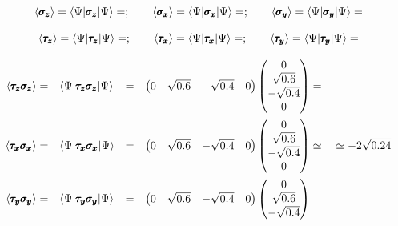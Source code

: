 \documentclass[solutions.tex]{subfiles}
\begin{document}
\[
	\avg{\bm{\sigma_z}} = \bra{\Psi}\bm{\sigma_z}\ket{\Psi} =
		;\qquad
	\avg{\bm{\sigma_x}} = \bra{\Psi}\bm{\sigma_x}\ket{\Psi} =
		;\qquad
	\avg{\bm{\sigma_y}} = \bra{\Psi}\bm{\sigma_y}\ket{\Psi} =
		
\]

\[
	\avg{\bm{\tau_z}} = \bra{\Psi}\bm{\tau_z}\ket{\Psi} =
		;\qquad
	\avg{\bm{\tau_x}} = \bra{\Psi}\bm{\tau_x}\ket{\Psi} =
		;\qquad
	\avg{\bm{\tau_y}} = \bra{\Psi}\bm{\tau_y}\ket{\Psi} =
		
\]

\begin{equation*}\begin{aligned}
	\left\langle \pmb{\tau_z\sigma_z} \right\rangle &=&& \langle \Psi|\pmb{\tau_z\sigma_z}|\Psi\rangle
		&=&& \begin{pmatrix} 0 & \sqrt{0.6} & -\sqrt{0.4} & 0\end{pmatrix}
		\begin{pmatrix}
			0 \\
			\sqrt{0.6} \\
			-\sqrt{0.4} \\
			0 \\
		\end{pmatrix} &=&&  \\
	\left\langle \pmb{\tau_x\sigma_x} \right\rangle &=&& \langle \Psi|\pmb{\tau_x\sigma_x}|\Psi\rangle
		&=&& \begin{pmatrix} 0 & \sqrt{0.6} & -\sqrt{0.4} & 0\end{pmatrix}
		\begin{pmatrix}
			0 \\
			\sqrt{0.6} \\
			-\sqrt{0.4} \\
			0 \\
		\end{pmatrix} &\simeq&& 
		\simeq -2\sqrt{0.24} \\
	\left\langle \pmb{\tau_y\sigma_y} \right\rangle &=&& \langle \Psi|\pmb{\tau_y\sigma_y}|\Psi\rangle
		&=&& \begin{pmatrix} 0 & \sqrt{0.6} & -\sqrt{0.4} & 0\end{pmatrix}
		\begin{pmatrix}
			0 \\
			\sqrt{0.6} \\
			-\sqrt{0.4} \\

\end{pmatrix}
\end{aligned}
\end{equation*}
\end{document}
